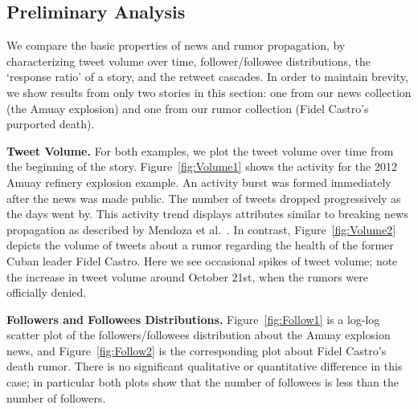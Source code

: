 \subsection{Preliminary Analysis}
We compare the basic properties of news and rumor propagation,
by characterizing
tweet volume over time, follower/followee distributions, the `response ratio'
of a story, and the retweet cascades. In order to maintain brevity, we show
results from only two stories in this section: one from our news
collection (the Amuay explosion) and one from our rumor collection (Fidel
Castro's purported death).

\textbf{Tweet Volume.} For both examples, we plot the tweet volume over time from the beginning of the story. Figure~\ref{fig:Volume1} shows the activity for the
2012 Amuay refinery explosion example. An activity burst was formed immediately after the news was made public. The number of tweets dropped progressively as the days went by. This activity trend displays attributes similar to breaking news propagation as described by Mendoza
et al.~\cite{Mendoza:2010}. In contrast, Figure~\ref{fig:Volume2} depicts
the volume of tweets about a rumor regarding the health of the
former Cuban leader Fidel Castro. Here we see
occasional spikes of
tweet volume; note the increase in tweet volume
around October 21st, when the rumors were officially denied.

\textbf{Followers and Followees Distributions.} Figure~\ref{fig:Follow1} is a log-log
scatter plot of the followers/followees distribution about
the Amuay explosion news, and Figure~\ref{fig:Follow2} is the corresponding
plot about Fidel Castro's death rumor. There is no significant
qualitative or quantitative difference in this case; in particular both
plots show that
the number of followees is less than the number of followers.


